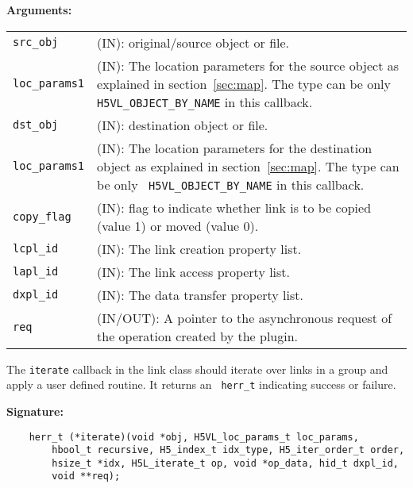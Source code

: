 \textbf{Arguments:}\\
\begin{tabular}{l p{10cm}}
  {\tt src\_obj} & (IN): original/source object or file. \\
  {\tt loc\_params1} & (IN): The location parameters for the source
  object as explained in section~\ref{sec:map}. The type can be only {\tt
    H5VL\_OBJECT\_BY\_NAME} in this callback. \\
  {\tt dst\_obj} & (IN): destination object or file. \\
  {\tt loc\_params1} & (IN): The location parameters for the destination
  object as explained in section~\ref{sec:map}. The type can be only {\tt
    H5VL\_OBJECT\_BY\_NAME} in this callback. \\
  {\tt copy\_flag} & (IN): flag to indicate whether link is to be
  copied (value 1) or moved (value 0).\\
  {\tt lcpl\_id} & (IN): The link creation property list.\\
  {\tt lapl\_id} & (IN): The link access property list.\\
  {\tt dxpl\_id} & (IN): The data transfer property list.\\
  {\tt req} & (IN/OUT): A pointer to the asynchronous request of the
  operation created by the plugin.\\
\end{tabular}

The {\tt iterate} callback in the link class should iterate over links
in a group and apply a user defined routine. It returns an {\tt
  herr\_t} indicating success or failure.

\textbf{Signature:}
\begin{lstlisting}
    herr_t (*iterate)(void *obj, H5VL_loc_params_t loc_params, 
        hbool_t recursive, H5_index_t idx_type, H5_iter_order_t order, 
        hsize_t *idx, H5L_iterate_t op, void *op_data, hid_t dxpl_id, 
        void **req);
\end{lstlisting}

